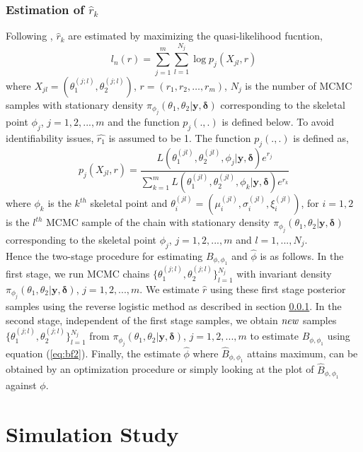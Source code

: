 \documentclass[11pt]{article}
\theoremstyle{remboldstyle}
\newcommand{\y}{{\boldsymbol{y}}}
\newcommand{\de}{{\boldsymbol{\delta}}}
\begin{document}
\subsubsection{Estimation of $\hat{r}_k$}
\label{sec:revlog}
\noindent
Following \cite{geyer:1994}, $\hat{r}_k$ are estimated by maximizing the quasi-likelihood fucntion,
\begin{equation}\label{func1}
l_n(r) = \sum\limits_{j = 1}^m\sum\limits_{l = 1}^{N_j} \log p_j(X_{jl},r)
\end{equation}
where $X_{jl} = (\theta_1^{(j;l)}, \theta_2^{(j;l)})$, $r = (r_1, r_2, \dots, r_m)$, $N_j$ is the number of MCMC samples with stationary density $\pi_{\phi_j}(\theta_1, \theta_2| \y, \de)$ corresponding to the skeletal point $\phi_j$, $j = 1, 2,..., m$ and the function $p_j(.,.)$ is defined below. To avoid identifiability issues, $\hat{r_1}$ is assumed to be 1. The function $p_j(.,.)$ is defined as,
\begin{equation}
p_j(X_{jl}, r) = \frac{L(\theta_1^{(jl)}, \theta_2^{(jl)}, \phi_j| \y, \de)e^{r_j}}{\sum\limits_{k = 1}^m L(\theta_1^{(jl)}, \theta_2^{(jl)}, \phi_k| \y, \de)e^{r_k}}
\end{equation}
where $\phi_k$ is the $k^{th}$ skeletal point and $\theta_i^{(jl)} = (\mu_i^{(jl)}, \sigma_i^{(jl)}, \xi_i^{(jl)})$, for $i = 1, 2$ is the $l^{th}$ MCMC sample of the chain with stationary density $\pi_{\phi_j}(\theta_1, \theta_2| \y, \de)$ corresponding to the skeletal point $\phi_j$, $j = 1, 2,..., m$ and $l = 1,...,N_j$.\\
Hence the two-stage procedure for estimating $B_{\phi, \phi_1}$ and $\hat{\phi}$ is as follows. In the first stage, we run MCMC chains $\{\theta_1^{(j;l)}, \theta_2^{(j;l)}\}_{l=1}^{N_j}$ with invariant density $\pi_{\phi_j}(\theta_1, \theta_2| \y, \de)$, $j = 1, 2, ... , m$. We estimate $\hat{r}$ using these first stage posterior samples using the reverse logistic method as described in section \ref{sec:revlog}. In the second stage, independent of the first stage samples, we obtain $\it{new}$ samples $\{\theta_1^{(j;l)}, \theta_2^{(j;l)}\}_{l=1}^{N_j}$ from $\pi_{\phi_j}(\theta_1, \theta_2| \y, \de)$, $j = 1, 2, ... , m$ to estimate $B_{\phi, \phi_1}$ using equation (\ref{eq:bf2}). Finally, the estimate $\hat{\phi}$ where $\hat{B}_{\phi, \phi_1}$ attains maximum, can be obtained by an optimization procedure or simply looking at the plot of $\hat{B}_{\phi, \phi_1}$ against $\phi$.
\section{Simulation Study}
\label{sec:sim}
\end{document}
